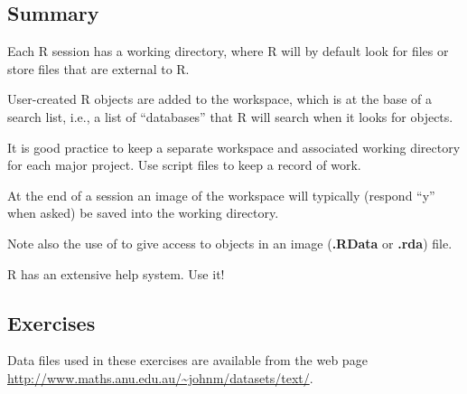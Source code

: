 \subsection{Summary}
\begin{itemizz}
\item[] Each R session has a working directory, where R will by
  default look for files or store files that are external to R.
\item[]
User-created R objects are added to the workspace, which is
at the base of a search list, i.e., a list of ``databases'' that R
will search when it looks for objects.
\item[] It is good practice to keep a separate workspace and
  associated working directory for each major project.  Use script
  files to keep a record of work.  
\item[] At the end of a session an image of the workspace will
  typically (respond ``y'' when asked) be saved into the working
  directory.
\item[] Note also the use of  to give access to objects
  in an image (\textbf{.RData} or \textbf{.rda})
  file.
\item[] R has an extensive help system.  Use it!
\end{itemizz}

\subsection{Exercises}\label{ss:wd}
Data files used in these exercises are available from the web
page  \url{http://www.maths.anu.edu.au/~johnm/datasets/text/}.

